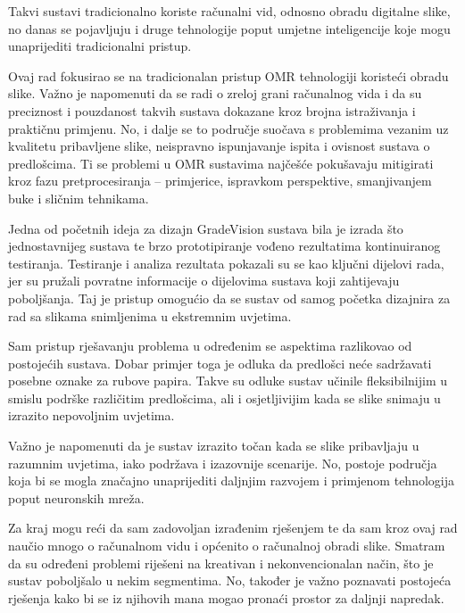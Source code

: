 \documentclass{foi}
\begin{document}
Takvi sustavi tradicionalno koriste računalni vid, odnosno obradu digitalne slike, no danas se pojavljuju i druge tehnologije poput umjetne inteligencije koje mogu unaprijediti tradicionalni pristup.

Ovaj rad fokusirao se na tradicionalan pristup OMR tehnologiji koristeći obradu slike. Važno je napomenuti da se radi o zreloj grani računalnog vida i da su preciznost i pouzdanost takvih sustava dokazane kroz brojna istraživanja i praktičnu primjenu. No, i dalje se to područje suočava s problemima vezanim uz kvalitetu pribavljene slike, neispravno ispunjavanje ispita i ovisnost sustava o predlošcima. Ti se problemi u OMR sustavima najčešće pokušavaju mitigirati kroz fazu pretprocesiranja – primjerice, ispravkom perspektive, smanjivanjem buke i sličnim tehnikama.

Jedna od početnih ideja za dizajn GradeVision sustava bila je izrada što jednostavnijeg sustava te brzo prototipiranje vođeno rezultatima kontinuiranog testiranja. Testiranje i analiza rezultata pokazali su se kao ključni dijelovi rada, jer su pružali povratne informacije o dijelovima sustava koji zahtijevaju poboljšanja. Taj je pristup omogućio da se sustav od samog početka dizajnira za rad sa slikama snimljenima u ekstremnim uvjetima.

Sam pristup rješavanju problema u određenim se aspektima razlikovao od postojećih sustava. Dobar primjer toga je odluka da predlošci neće sadržavati posebne oznake za rubove papira. Takve su odluke sustav učinile fleksibilnijim u smislu podrške različitim predlošcima, ali i osjetljivijim kada se slike snimaju u izrazito nepovoljnim uvjetima.

Važno je napomenuti da je sustav izrazito točan kada se slike pribavljaju u razumnim uvjetima, iako podržava i izazovnije scenarije. No, postoje područja koja bi se mogla značajno unaprijediti daljnjim razvojem i primjenom tehnologija poput neuronskih mreža.

Za kraj mogu reći da sam zadovoljan izrađenim rješenjem te da sam kroz ovaj rad naučio mnogo o računalnom vidu i općenito o računalnoj obradi slike. Smatram da su određeni problemi riješeni na kreativan i nekonvencionalan način, što je sustav poboljšalo u nekim segmentima. No, također je važno poznavati postojeća rješenja kako bi se iz njihovih mana mogao pronaći prostor za daljnji napredak.

\printbibliography[title=Popis literature]

\listoffigures
{}
 
\listoftables
{}

\appendix
\renewcommand{\thechapter}{\arabic{chapter}}
\end{document}
